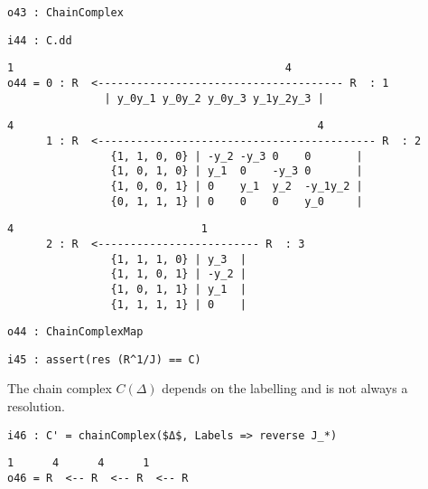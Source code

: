 \documentclass[12pt,leqno]{amsart}
\theoremstyle{definition}
\begin{document}
\begin{lstlisting}[xleftmargin=10pt, aboveskip=1.5pt, belowskip=1.5pt]
o43 : ChainComplex
\end{lstlisting}
\begin{lstlisting}[xleftmargin=10pt, aboveskip=1.5pt, belowskip=1.5pt]
i44 : C.dd
\end{lstlisting}
\begin{lstlisting}[xleftmargin=10pt, lineskip=-10pt, aboveskip=1.5pt, belowskip=3.0pt]
           1                                          4
o44 = 0 : R  <-------------------------------------- R  : 1
               | y_0y_1 y_0y_2 y_0y_3 y_1y_2y_3 |
\end{lstlisting}
\begin{lstlisting}[xleftmargin=10pt, lineskip=-10pt, aboveskip=1.5pt, belowskip=3.0pt]
           4                                               4
      1 : R  <------------------------------------------- R  : 2
                {1, 1, 0, 0} | -y_2 -y_3 0    0       |
                {1, 0, 1, 0} | y_1  0    -y_3 0       |
                {1, 0, 0, 1} | 0    y_1  y_2  -y_1y_2 |
                {0, 1, 1, 1} | 0    0    0    y_0     |
\end{lstlisting}
\begin{lstlisting}[xleftmargin=10pt, lineskip=-10pt, aboveskip=1.5pt, belowskip=1.5pt]
           4                             1
      2 : R  <------------------------- R  : 3
                {1, 1, 1, 0} | y_3  |
                {1, 1, 0, 1} | -y_2 |
                {1, 0, 1, 1} | y_1  |
                {1, 1, 1, 1} | 0    |
\end{lstlisting}
\begin{lstlisting}[xleftmargin=10pt, aboveskip=1.5pt, belowskip=1.5pt]
o44 : ChainComplexMap
\end{lstlisting}
\begin{lstlisting}[xleftmargin=10pt, aboveskip=1.5pt, belowskip=3.0pt]
i45 : assert(res (R^1/J) == C)
\end{lstlisting}
The chain complex $C(\Delta)$ 
depends on the labelling and is not always a resolution.
\begin{lstlisting}[xleftmargin=10pt, aboveskip=3.0pt, belowskip=1.5pt]
i46 : C' = chainComplex($Δ$, Labels => reverse J_*)
\end{lstlisting}
\begin{lstlisting}[xleftmargin=10pt, lineskip=-10pt, aboveskip=1.5pt, belowskip=1.5pt]
       1      4      4      1
o46 = R  <-- R  <-- R  <-- R
\end{lstlisting}
\end{document}
